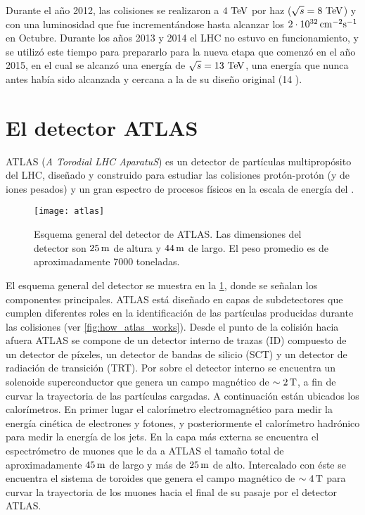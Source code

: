 Durante el año 2012, las colisiones se realizaron a $4\TeV$ por haz ($\sqrt{s} = 8 \TeV$)
y con una luminosidad que fue incrementándose hasta alcanzar los
$\unit[2 \cdot 10^{32}]{cm^{-2}s^{-1}}$ en Octubre. Durante los a\~nos 2013 y 2014
el LHC no estuvo en funcionamiento, y se utilizó este tiempo para prepararlo para
la nueva etapa que comenzó en el a\~no 2015, en el cual se alcanzó una energía de $\sqrt{s} = 13 \tev$,
una energía que nunca antes había sido alcanzada y cercana a la de su diseño
original (14 \tev).



\section{El detector ATLAS}

ATLAS (\emph{A Torodial LHC AparatuS}) es un detector de partículas
multipropósito del LHC, diseñado y construido para estudiar las colisiones
protón-protón (y de iones pesados) y un gran espectro de procesos físicos en la
escala de energía del \tev.

\begin{figure}[!tb]
  \centering

  \texttt{[image: atlas]}
  \caption{Esquema general del detector de ATLAS. Las dimensiones del detector
    son $\unit[25]{m}$ de altura y $\unit[44]{m}$ de largo. El peso promedio es
    de aproximadamente 7000 toneladas.}
  \label{fig:atlas}

\end{figure}

El esquema general del detector se muestra en la \cref{fig:atlas}, donde se
señalan los componentes principales. ATLAS está diseñado en capas de
subdetectores que cumplen diferentes roles en la identificación de las
partículas producidas durante las colisiones (ver \cref{fig:how_atlas_works}).
Desde el punto de la colisión
hacia afuera ATLAS se compone de un detector interno de trazas (ID) compuesto de
un detector de píxeles, un detector de bandas de silicio (SCT) y un detector de
radiación de transición (TRT).
Por sobre el detector interno se encuentra un
solenoide superconductor que genera un campo magnético de $\sim \unit[2]{T}$, a fin
de curvar la trayectoria de las partículas cargadas.
A continuación están ubicados los calorímetros. En primer lugar el calorímetro
electromagnético para medir la energía cinética de electrones y fotones, y
posteriormente el calorímetro hadrónico para medir la energía de los jets.
En la capa más externa se encuentra el espectrómetro de muones que le da a ATLAS
el tamaño total de aproximadamente $\unit[45]{m}$ de largo y más de
$\unit[25]{m}$ de alto. Intercalado con éste se encuentra el sistema de toroides
que genera el campo magnético de $\sim \unit[4]{T}$ para curvar la trayectoria de
los muones hacia el final de su pasaje por el detector ATLAS.

